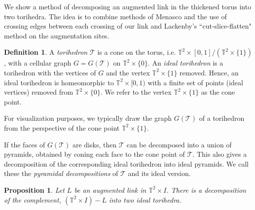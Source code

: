 \documentclass[11pt]{amsart}
\newcommand{\torus}{{\mathbb{T}^2}}
\newcommand{\sT}{{\mathcal{T}}}
\theoremstyle{plain}
\newtheorem{prop}[theorem]{Proposition}
\theoremstyle{definition}
\newtheorem{define}[theorem]{Definition}
\begin{document}
We show a method of decomposing an augmented link in the thickened torus into
two torihedra. The idea is to combine methods of Menasco
\cite{Menasco} and the use of crossing edges between each crossing of our link
and Lackenby's ``cut-slice-flatten" method \cite{lackenby} on the augmentation
sites.   


\begin{define}\cite{CKP2}
\label{def:torihedron}
A \emph{torihedron} $\sT$ is a cone on the torus, 
i.e. $\torus \times [0,1]/(\torus \times \{1\})$, with a cellular graph
$G = G(\sT)$ on $\torus \times \{0\}$.
An \emph{ideal torihedron} is a torihedron with the
vertices of $G$ and the vertex $\torus \times \{1\}$ removed. Hence, an ideal
torihedron is homeomorphic to $\torus \times [0,1)$ with a finite set of points
(ideal vertices) removed from $\torus \times \{0\}$.
We refer to the vertex $\torus \times \{1\}$ as the cone point.
\end{define}


For visualization purposes, we typically draw the graph $G(\sT)$ of a
torihedron from the perspective of the cone point $\torus \times \{1\}$.

If the faces of $G(\sT)$ are disks,
then $\sT$ can be decomposed into a union of pyramids,
obtained by coning each face to the cone point of $\sT$.
This also gives a decomposition of the corresponding ideal torihedron
into ideal pyramids.
We call these the \emph{pyramidal decompositions} of $\sT$ and its
ideal version.


\begin{prop}\label{p:tori_decomp}
Let $L$ be an augmented link in $\torus \times I$.
There is a decomposition of the complement,
$(\torus \times I) - L$ into two ideal torihedra.
\end{prop}
\end{document}
